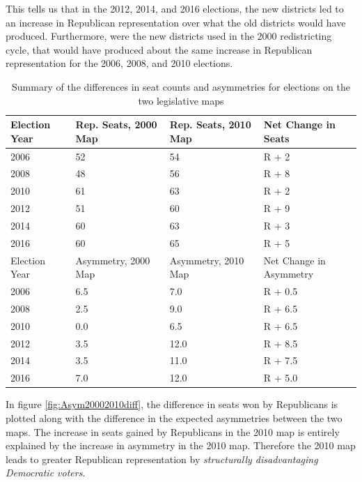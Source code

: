 \documentclass[preprint,12pt]{article}
\begin{document}
This tells us that in the 2012, 2014, and 2016 elections, the new districts led to an increase in Republican representation over what the old districts would have produced.
Furthermore, were the new districts used in the 2000 redistricting cycle, that would have produced about the same increase in Republican representation for the 2006, 2008, and 2010 elections.

\begin{table}[htb!]
\centering
\caption{Summary of the differences in seat counts and asymmetries for elections on the two legislative maps \label{tab:seats}}
\begin{tabular}{|l|l|l|l|}
\hline
Election Year & Rep. Seats, 2000 Map & Rep. Seats, 2010 Map & Net Change in Seats\\
\hline
\hline
2006 & 52 & 54 & R + 2\\
\hline
2008 & 48 & 56 & R + 8\\
\hline
2010 & 61 & 63 & R + 2\\
\hline
2012 & 51 & 60 & R + 9\\
\hline
2014 & 60 & 63 & R + 3\\
\hline
2016 & 60 & 65 & R + 5\\
\hline
\hline
Election Year & Asymmetry, 2000 Map & Asymmetry, 2010 Map & Net Change in Asymmetry\\
\hline
\hline
2006 & 6.5 & 7.0 & R + 0.5\\
\hline
2008 & 2.5 & 9.0 & R + 6.5\\
\hline
2010 & 0.0 & 6.5 & R + 6.5\\
\hline
2012 & 3.5 & 12.0 & R + 8.5\\
\hline
2014 & 3.5 & 11.0 & R + 7.5\\
\hline
2016 & 7.0 & 12.0 & R + 5.0\\
\hline
\end{tabular}
\end{table}


In figure \ref{fig:Asym20002010diff}, the difference in seats won by Republicans is plotted along with the difference in the expected asymmetries between the two maps.
The increase in seats gained by Republicans in the 2010 map is entirely explained by the increase in asymmetry in the 2010 map.
Therefore the 2010 map leads to greater Republican representation by \emph{structurally disadvantaging Democratic voters}.
\end{document}
